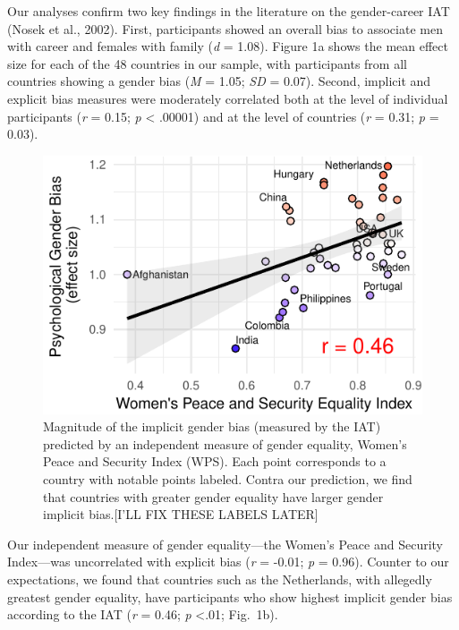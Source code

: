 \documentclass[10pt, letterpaper]{article}
\newenvironment{CodeChunk}{}{}
\begin{document}
Our analyses confirm two key findings in the literature on the
gender-career IAT (Nosek et al., 2002). First, participants showed an
overall bias to associate men with career and females with family
(\emph{d} = 1.08). Figure 1a shows the mean effect size for each of the
48 countries in our sample, with participants from all countries showing
a gender bias (\emph{M} = 1.05; \emph{SD} = 0.07). Second, implicit and
explicit bias measures were moderately correlated both at the level of
individual participants (\emph{r} = 0.15; \emph{p} \textless{} .00001)
and at the level of countries (\emph{r} = 0.31; \emph{p} = 0.03).

\begin{CodeChunk}
\begin{figure}[t]

{\centering \includegraphics{figs/WPS_plot-1} 

}

\caption[Magnitude of the implicit gender bias (measured by the IAT) predicted by an independent measure of gender equality, Women's Peace and Security Index (WPS)]{Magnitude of the implicit gender bias (measured by the IAT) predicted by an independent measure of gender equality, Women's Peace and Security Index (WPS).  Each point corresponds to a country with notable points labeled. Contra our prediction, we find that countries with greater gender equality have larger gender implicit bias.[I'LL FIX THESE LABELS LATER]}\label{fig:WPS_plot}
\end{figure}
\end{CodeChunk}

Our independent measure of gender equality---the Women's Peace and
Security Index---was uncorrelated with explicit bias (\emph{r} = -0.01;
\emph{p} = 0.96). Counter to our expectations, we found that countries
such as the Netherlands, with allegedly greatest gender equality, have
participants who show highest implicit gender bias according to the IAT
(\emph{r} = 0.46; \emph{p} \textless{}.01; Fig.~1b).
\end{document}
